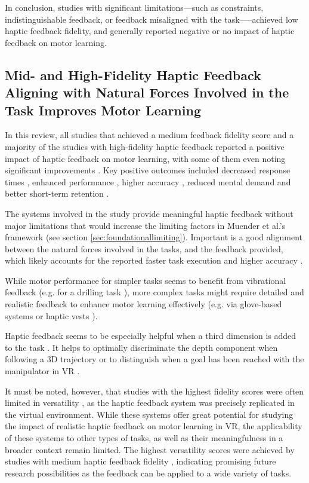 In conclusion, studies with significant limitations---such as constraints, indistinguishable feedback, or feedback misaligned with the task—--achieved low haptic feedback fidelity, and generally reported negative or no impact of haptic feedback on motor learning.


\subsection{Mid- and High-Fidelity Haptic Feedback Aligning with Natural Forces Involved in the Task Improves Motor Learning}

In this review, all studies that achieved a medium feedback fidelity score and a majority of the studies with high-fidelity haptic feedback reported a positive impact of haptic feedback on motor learning, with some of them even noting significant improvements \cite{Yang2023, LiuH2019, Dai2023, Grant2019, Fehlberg2012, Huang2006}. 
Key positive outcomes included decreased response times \cite{Najdovski2020}, enhanced performance \cite{Chappell2022, Fehlberg2012, Mohanty2023}, higher accuracy \cite{Perez2023}, reduced mental demand \cite{Yang2023, Trinitatova2023} and better short-term retention \cite{LeeH2014}.

The systems involved in the study provide meaningful haptic feedback without major limitations that would increase the limiting factors in Muender et al.'s framework (see section \ref{sec:foundationallimiting}). Important is a good alignment between the natural forces involved in the tasks, and the feedback provided, which likely accounts for the reported faster task execution and higher accuracy \cite{Najdovski2020, Yang2023}. 

While motor performance for simpler tasks seems to benefit from vibrational feedback (e.g. for a drilling task \cite{Yang2023, Grant2019}), more complex tasks might require detailed and realistic feedback to enhance motor learning effectively (e.g. via glove-based systems \cite{Trinitatova2023} or haptic vests \cite{Xia2023}).

Haptic feedback seems to be especially helpful when a third dimension is added to the task \cite{Rodriguez2010, Gunter2022, Brickler2019}. It helps to optimally discriminate the depth component when following a 3D trajectory or to distinguish when a goal has been reached with the manipulator in VR \cite{Wall2000}.

It must be noted, however, that studies with the highest fidelity scores were often limited in versatility \cite{Huang2007, Vaghela2021}, as the haptic feedback system was precisely replicated in the virtual environment. While these systems offer great potential for studying the impact of realistic haptic feedback on motor learning in VR, the applicability of these systems to other types of tasks, as well as their meaningfulness in a broader context remain limited.
The highest versatility scores were achieved by studies with medium haptic feedback fidelity \cite{Yang2023, McAnally2023}, indicating promising future research possibilities as the feedback can be applied to a wide variety of tasks.

